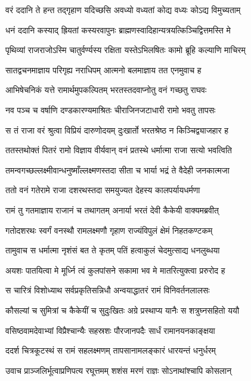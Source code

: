 \twolineshloka
{वरं ददानि ते हन्त तद्गृहाण यदिच्छसि}
{अवध्यो वध्यतां कोद्य वध्यः कोऽद्य विमुच्यताम्}


\twolineshloka
{धनं ददानि कस्याद् ह्रियतां कस्यरवापुनः}
{ब्राह्मणस्वादिहान्यत्रयत्किञ्चिद्वित्तमस्ति मे}


\twolineshloka
{पृथिव्यां राजराजोऽस्मि चातुर्वर्ण्यस्य रक्षिता}
{यस्तेऽभिलषितः कामो ब्रूहि कल्याणि माचिरम्}


\twolineshloka
{सातद्वचनमाज्ञाय परिगृह्य नराधिपम्}
{आत्मनो बलमाज्ञाय तत एनमुवाच ह}


\twolineshloka
{आभिषेचनिकं यत्ते रामार्थमुपकल्पितम्}
{भरतस्तदवाप्नोतु वनं गच्छतु राघवः}


\twolineshloka
{नव पञ्च च वर्षाणि दण्डकारण्यमाश्रितः}
{चीराजिनजटाधारी रामो भवतु तापसः}


\twolineshloka
{स तं राजा वरं श्रुत्वा विप्रियं दारुणोदयम्}
{दुःखार्तो भरतश्रेष्ठ न किञ्चिद्व्याजहार ह}


\twolineshloka
{ततस्तथोक्तं पितरं रामो विज्ञाय वीर्यवान्}
{वनं प्रतस्थे धर्मात्मा राजा सत्यो भवत्विति}


\twolineshloka
{तमन्वगच्छल्लक्ष्मीवान्धनुष्माँल्लक्ष्मणस्तदा}
{सीता च भार्या भद्रं ते वैदेही जनकात्मजा}


\twolineshloka
{ततो वनं गतेरामे राजा दशरथस्तदा}
{समयुज्यत देहस्य कालपर्यायधर्मणा}


\twolineshloka
{रामं तु गतमाज्ञाय राजानं च तथागतम्}
{अनार्या भरतं देवी कैकेयी वाक्यमब्रवीत्}


\twolineshloka
{गतोदशरथः स्वर्गं वनस्थौ रामलक्ष्मणौ}
{गृहाण राज्यंविपुलं क्षेमं निहतकण्टकम्}


\twolineshloka
{तामुवाच स धर्मात्मा नृशंसं बत ते कृतम्}
{पतिं हत्वाकुलं चेदमुत्साद्य धनलुब्धया}


\twolineshloka
{अयशः पातयित्वा मे मूर्ध्नि त्वं कुलपांसने}
{सकामा भव मे मातरित्युक्त्वा प्ररुरोद ह}


\twolineshloka
{स चारित्रं विशोध्याथ सर्वप्रकृतिसन्निधौ}
{अन्वयाद्धातरं रामं विनिवर्तनलालसः}


\twolineshloka
{कौसल्यां च सुमित्रां च कैकेयीं च सुदुःखितः}
{अग्रे प्रस्थाप्य यानैः स शत्रुघ्नसहितो ययौ}


\twolineshloka
{वसिष्ठवामदेवाभ्यां विप्रैश्चान्यैः सहस्रशः}
{पौरजानपदैः सार्धं रामानयनकाङ्क्षया}


\twolineshloka
{ददर्श चित्रकूटस्थं स रामं सहलक्ष्मणम्}
{तापसानामलङ्कारं धारयन्तं धनुर्धरम्}


\twolineshloka
{उवाच प्राञ्जलिर्भूत्वाप्रणिपत्य रघूत्तमम्}
{शशंस मरणं राज्ञः सोऽनाथांश्चापि कोसलान्}


